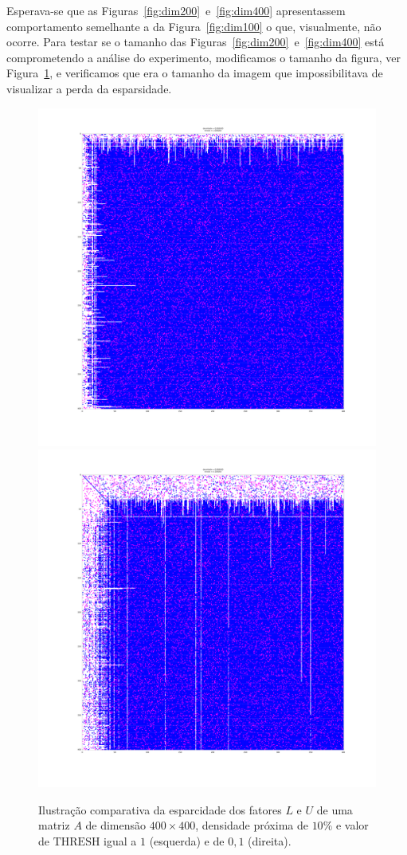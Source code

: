 \documentclass[12pt,a4paper]{article}
\begin{document}
Esperava-se que as Figuras~\ref{fig:dim200}~e~\ref{fig:dim400} apresentassem
comportamento semelhante a da Figura~\ref{fig:dim100} o que, visualmente, não
ocorre. Para testar se o tamanho das Figuras~\ref{fig:dim200}~e~\ref{fig:dim400}
está comprometendo a análise do experimento, modificamos o tamanho da figura,
ver Figura~\ref{fig:zoom}, e verificamos que era o tamanho da imagem que
impossibilitava de visualizar a perda da esparsidade. 
\begin{figure}[!htb]
    \begin{center}
        \includegraphics[width=.4\textwidth, trim=300 300 250 100,
        clip]{src/zoom400-3-1.png}
        \includegraphics[width=.4\textwidth, trim=300 300 250 100,
        clip]{src/zoom400-3-5.png}
    \end{center}
    \caption{Ilustração comparativa da esparcidade dos fatores $L$ e $U$ de uma
    matriz $A$ de dimensão $400 \times 400$, densidade próxima de $10\%$ e valor de
    $\mathrm{THRESH}$ igual a $1$ (esquerda) e de $0,1$ (direita).}
    \label{fig:zoom}
\end{figure}
\end{document}
